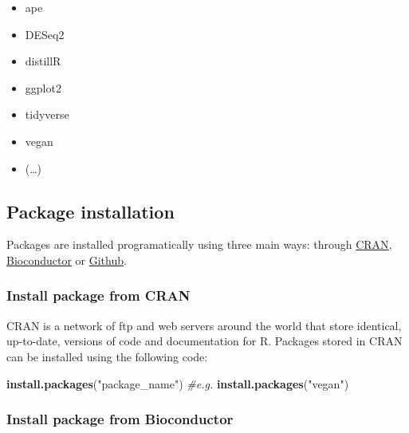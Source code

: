 \documentclass[
]{book}
\newenvironment{Shaded}{\begin{snugshade}}{\end{snugshade}}
\newcommand{\CommentTok}[1]{\textcolor[rgb]{0.56,0.35,0.01}{\textit{#1}}}
\newcommand{\FunctionTok}[1]{\textcolor[rgb]{0.13,0.29,0.53}{\textbf{#1}}}
\newcommand{\NormalTok}[1]{#1}
\newcommand{\StringTok}[1]{\textcolor[rgb]{0.31,0.60,0.02}{#1}}
\providecommand{\tightlist}{%
  \setlength{\itemsep}{0pt}\setlength{\parskip}{0pt}}
\begin{document}
\begin{itemize}
\tightlist
\item
  ape
\item
  DESeq2
\item
  distillR
\item
  ggplot2
\item
  tidyverse
\item
  vegan
\item
  (\ldots)
\end{itemize}

\hypertarget{package-installation}{%
\subsection*{Package installation}\label{package-installation}}

Packages are installed programatically using three main ways: through \href{https://cran.r-project.org/web/packages/available_packages_by_name.html}{CRAN}, \href{https://www.bioconductor.org/packages/release/bioc/}{Bioconductor} or \href{https://github.com/}{Github}.

\hypertarget{install-package-from-cran}{%
\subsubsection*{Install package from CRAN}\label{install-package-from-cran}}

CRAN is a network of ftp and web servers around the world that store identical, up-to-date, versions of code and documentation for R. Packages stored in CRAN can be installed using the following code:

\small

\begin{Shaded}
\begin{Highlighting}[]
\FunctionTok{install.packages}\NormalTok{(}\StringTok{"package\_name"}\NormalTok{)}
\CommentTok{\#e.g.}
\FunctionTok{install.packages}\NormalTok{(}\StringTok{"vegan"}\NormalTok{)}
\end{Highlighting}
\end{Shaded}

\normalsize

\hypertarget{install-package-from-bioconductor}{%
\subsubsection*{Install package from Bioconductor}\label{install-package-from-bioconductor}}
\end{document}
